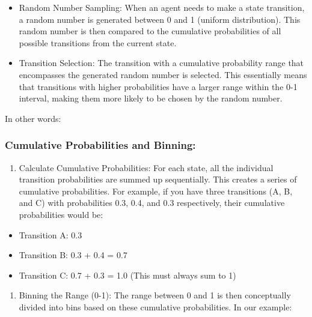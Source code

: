 \documentclass[
]{article}
\providecommand{\tightlist}{%
  \setlength{\itemsep}{0pt}\setlength{\parskip}{0pt}}
\begin{document}
\begin{itemize}
\item
  Random Number Sampling: When an agent needs to make a state
  transition, a random number is generated between 0 and 1 (uniform
  distribution). This random number is then compared to the cumulative
  probabilities of all possible transitions from the current state.
\item
  Transition Selection: The transition with a cumulative probability
  range that encompasses the generated random number is selected. This
  essentially means that transitions with higher probabilities have a
  larger range within the 0-1 interval, making them more likely to be
  chosen by the random number.
\end{itemize}

In other words:

\hypertarget{cumulative-probabilities-and-binning}{%
\subsubsection{Cumulative Probabilities and
Binning:}\label{cumulative-probabilities-and-binning}}

\begin{enumerate}
\def\labelenumi{\arabic{enumi}.}
\tightlist
\item
  Calculate Cumulative Probabilities: For each state, all the individual
  transition probabilities are summed up sequentially. This creates a
  series of cumulative probabilities. For example, if you have three
  transitions (A, B, and C) with probabilities 0.3, 0.4, and 0.3
  respectively, their cumulative probabilities would be:
\end{enumerate}

\begin{itemize}
\tightlist
\item
  Transition A: 0.3
\item
  Transition B: 0.3 + 0.4 = 0.7
\item
  Transition C: 0.7 + 0.3 = 1.0 (This must always sum to 1)
\end{itemize}

\begin{enumerate}
\def\labelenumi{\arabic{enumi}.}
\setcounter{enumi}{1}
\tightlist
\item
  Binning the Range (0-1): The range between 0 and 1 is then
  conceptually divided into bins based on these cumulative
  probabilities. In our example:
\end{enumerate}
\end{document}
